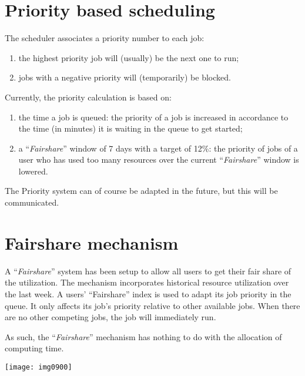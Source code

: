 \section{Priority based scheduling}

The scheduler associates a priority number to each job:

\begin{enumerate}
\item  the highest priority job will (usually) be the next one to run;
\item  jobs with a negative priority will (temporarily) be blocked.
\end{enumerate}

Currently, the priority calculation is based on:

\begin{enumerate}
\item  the time a job is queued: the priority of a job is increased in accordance to the time (in minutes) it is waiting in the queue to get started;
\item  a ``\emph{Fairshare}'' window of 7 days with a target of 12\%: the priority of jobs of a user who has used too many resources over the current ``\emph{Fairshare}'' window is lowered.
\end{enumerate}

The Priority system can of course be adapted in the future, but this will be communicated.


\section{Fairshare mechanism}

A ``\emph{Fairshare}'' system has been setup to allow all users to get their
fair share of the \hpc utilization.  The mechanism incorporates historical
resource utilization over the last week.  A users' ``Fairshare'' index is used
to adapt its job priority in the queue.  It only affects its job's priority
relative to other available jobs. When there are no other competing jobs, the
job will immediately run.

As such, the ``\emph{Fairshare}'' mechanism has nothing to do with the
allocation of computing time.

\texttt{[image: img0900]}


%
